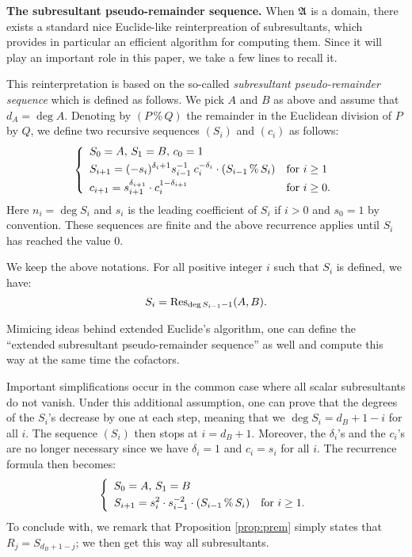 \documentclass{sig-alternate}
\begin{document}
\medskip

\noindent
\textbf{The subresultant pseudo-remainder sequence.}
When $\mathfrak A$ is a domain, there exists a standard nice Euclide-like
reinterpreation of subresultants, which provides in particular an 
efficient algorithm for computing them. Since it will play an important 
role in this paper, we take a few lines to recall it.

This reinterpretation is based on the so-called \emph{subresultant 
pseudo-remainder sequence} which is defined as follows. We pick $A$ and 
$B$ as above and assume that $d_A = \deg A$. Denoting by $(P \,\%\, Q)$ 
the remainder in the Euclidean division of $P$ by $Q$, we define two 
recursive sequences $(S_i)$ and $(c_i)$ as follows:
$$\left\{\begin{array}{ll}
S_0 = A, \, S_1 = B, \, c_0 = 1 \smallskip \\
\displaystyle S_{i+1} = (-s_i)^{\delta_i + 1}
s_{i-1}^{-1} \: c_i^{-\delta_i} \cdot (S_{i-1} \,\%\, S_i)
& \text{for } i \geq 1 \smallskip \\
\displaystyle c_{i+1} = s_{i+1}^{\delta_{i+1}} \cdot c_i^{1-\delta_{i+1}}
& \text{for } i \geq 0. 
\end{array}\right.$$
Here $n_i = \deg S_i$ and $s_i$ is the leading coefficient of 
$S_i$ if $i > 0$ and $s_0 = 1$ by convention. These sequences are
finite and the above recurrence applies until $S_i$ has reached the
value $0$.


\begin{prop}
\label{prop:prem}
We keep the above notations. For all positive integer $i$ such that
$S_i$ is defined, we have:
$$S_i = \text{\rm Res}_{\deg S_{i-1} - 1} (A,B).$$
\end{prop}

\begin{rem}
Mimicing ideas behind extended Euclide's algorithm, one can define the 
``extended subresultant pseudo-remainder sequence'' as well and compute
this way at the same time the cofactors.
\end{rem}

Important simplifications occur in the common case where all scalar 
subresultants do not vanish. Under this additional assumption, one can 
prove that the degrees of the $S_i$'s decrease by one at each step, 
meaning that we $\deg S_i = d_B + 1 - i$ for all $i$. The sequence 
$(S_i)$ then stops at $i = d_B + 1$. Moreover, the $\delta_i$'s and the 
$c_i$'s are no longer necessary since we have $\delta_i = 1$ and $c_i = 
s_i$ for all $i$. The recurrence formula then becomes:
$$\left\{\begin{array}{ll}
S_0 = A, \, S_1 = B \smallskip \\
\displaystyle S_{i+1} = s_i^2 \cdot s_{i-1}^{-2}
\cdot (S_{i-1} \,\%\, S_i) & \text{for } i \geq 1.
\end{array}\right.$$
To conclude with, we remark that Proposition \ref{prop:prem} simply 
states that $R_j = S_{d_B+1-j}$; we then get this way all subresultants.
\end{document}
